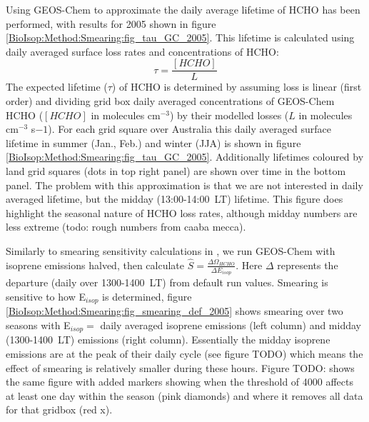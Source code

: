     
    Using GEOS-Chem to approximate the daily average lifetime of HCHO has been performed, with results for 2005 shown in figure \ref{BioIsop:Method:Smearing:fig_tau_GC_2005}.
    This lifetime is calculated using daily averaged surface loss rates and concentrations of HCHO:
    \begin{equation*}
      \tau = \frac{[HCHO]}{L}
    \end{equation*}
    The expected lifetime ($\tau$) of HCHO is determined by assuming loss is linear (first order) and dividing grid box daily averaged concentrations of GEOS-Chem HCHO ($[HCHO]$ in molecules cm$^{-3}$) by their modelled losses ($L$ in molecules cm$^{-3}$ s${-1}$).
    For each grid square over Australia this daily averaged surface lifetime in summer (Jan., Feb.) and winter (JJA) is shown in figure \ref{BioIsop:Method:Smearing:fig_tau_GC_2005}.
    Additionally lifetimes coloured by land grid squares (dots in top right panel) are shown over time in the bottom panel.
    The problem with this approximation is that we are not interested in daily averaged lifetime, but the midday (13:00-14:00~LT) lifetime.
    This figure does highlight the seasonal nature of HCHO loss rates, although midday numbers are less extreme (todo: rough numbers from caaba mecca).
    
    
    
    Similarly to smearing sensitivity calculations in \textcite{Marais2012}, we run GEOS-Chem with isoprene emissions halved, then calculate $\hat{S} = \frac{\Delta \Omega_{HCHO}}{\Delta E_{isop}} $.
    Here $\Delta$ represents the departure (daily over 1300-1400~LT) from default run values.
    Smearing is sensitive to how E$_{isop}$ is determined, figure \ref{BioIsop:Method:Smearing:fig_smearing_def_2005} shows smearing over two seasons with E$_{isop} =$ daily averaged isoprene emissions (left column) and midday (1300-1400~LT) emissions (right column). 
    Essentially the midday isoprene emissions are at the peak of their daily cycle (see figure TODO) which means the effect of smearing is relatively smaller during these hours.
    Figure TODO: shows the same figure with added markers showing when the threshold of 4000 \parencite[as in][]{Marais2012} affects at least one day within the season (pink diamonds) and where it removes all data for that gridbox (red x).
    
